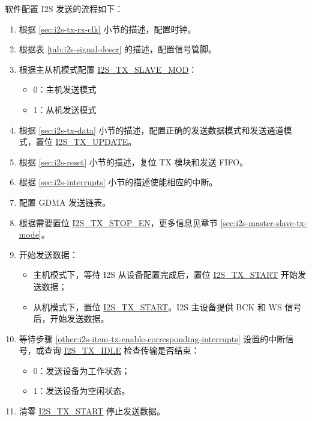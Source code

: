 \documentclass[main\_\_CN.tex]{subfiles}
\begin{document}
软件配置 I2S 发送的流程如下：

\begin{enumerate}
    \item 根据 \ref{sec:i2s-tx-rx-clk} 小节的描述，配置时钟。
    \item 根据表 \ref{tab:i2s-signal-descr} 的描述，配置信号管脚。
    \item 根据主从机模式配置 \hyperref[fielddesc:I2STXSLAVEMOD]{I2S\_TX\_SLAVE\_MOD}：
    \begin{itemize}
        \item 0：主机发送模式
        \item 1：从机发送模式
    \end{itemize}
    \item 根据 \ref{sec:i2s-tx-data} 小节的描述，配置正确的发送数据模式和发送通道模式，置位 \hyperref[fielddesc:I2STXUPDATE]{I2S\_TX\_UPDATE}。
    \item 根据 \ref{sec:i2s-reset} 小节的描述，复位 TX 模块和发送 FIFO。
    \item 根据 \ref{sec:i2s-interrupts} 小节的描述使能相应的中断。\label{other:i2s-item-tx-enable-corresponding-interrupts}
    \item 配置 GDMA 发送链表。 
    \item 根据需要置位 \hyperref[fielddesc:I2STXSTOPEN]{I2S\_TX\_STOP\_EN}，更多信息见章节 \ref{sec:i2s-master-slave-tx-mode}。
    \item 开始发送数据：
    \begin{itemize}
        \item 主机模式下，等待 I2S 从设备配置完成后，置位 \hyperref[fielddesc:I2STXSTART]{I2S\_TX\_START} 开始发送数据；
        \item 从机模式下，置位 \hyperref[fielddesc:I2STXSTART]{I2S\_TX\_START}。I2S 主设备提供 BCK 和 WS 信号后，开始发送数据。
    \end{itemize}
    \item 等待步骤 \ref{other:i2s-item-tx-enable-corresponding-interrupts} 设置的中断信号，或查询 \hyperref[fielddesc:I2STXIDLE]{I2S\_TX\_IDLE} 检查传输是否结束：
    \begin{itemize}
        \item 0：发送设备为工作状态；
        \item 1：发送设备为空闲状态。
    \end{itemize}
    \item 清零 \hyperref[fielddesc:I2STXSTART]{I2S\_TX\_START} 停止发送数据。
\end{enumerate}
\end{document}
